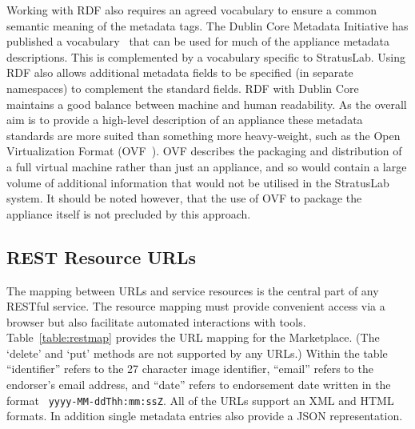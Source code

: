 Working with RDF also requires an agreed vocabulary to ensure a common
semantic meaning of the metadata tags.  The Dublin Core Metadata
Initiative has published a vocabulary~\cite{dcterms} that can be used
for much of the appliance metadata descriptions.  This is complemented by
a vocabulary specific to StratusLab.  Using RDF also allows additional
metadata fields to be specified (in separate namespaces) to complement
the standard fields. RDF with Dublin Core maintains a good balance between machine 
and human readability. As the overall aim is to provide a high-level description 
of an appliance these metadata standards are more suited than something more heavy-weight, 
such as the Open Virtualization Format (OVF~\cite{ovf:vmware-xensource07}). OVF describes 
the packaging and distribution of a full virtual machine rather than just an appliance, 
and so would contain a large volume of additional information that would 
not be utilised in the StratusLab system. It should be noted however, that 
the use of OVF to package the appliance itself is not precluded by this approach. 

\subsection{REST Resource URLs}

The mapping between URLs and service resources is the central part of
any RESTful service.  The resource mapping must provide convenient
access via a browser but also facilitate automated interactions with
tools.  Table~\ref{table:restmap} provides the URL mapping for the
Marketplace.  (The `delete' and `put' methods are not supported by any
URLs.)  Within the table ``identifier'' refers to the 27 character
image identifier, ``email'' refers to the endorser's email address,
and ``date'' refers to endorsement date written in the format {\tt
  yyyy-MM-ddThh:mm:ssZ}.  All of the URLs support an
XML and HTML formats.  In addition single metadata entries also 
provide a JSON representation.

